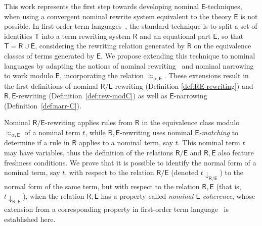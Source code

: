 \documentclass[11pt,a4paper]{amsart}
\newcommand{\theory}[1]{\ensuremath{\mathsf{#1}}}
\theoremstyle{plain}
\theoremstyle{definition}
\theoremstyle{remark}
\begin{document}
 This work represents the first step towards developing nominal \theory{E}-techniques, when using a convergent nominal rewrite system equivalent to the theory $\theory{E}$ is not possible.  
 In first-order term languages~\cite{JouannaudKK83:Incremental, Viola01, VariantNarrowing:EscobarMS09}, the standard technique is to split a set of identities \theory{T}  into a term rewriting system $\theory{R}$ and an equational part $\theory{E}$, so that $\theory{T}=\theory{R}{\cup}\theory{E}$, considering the rewriting relation generated by $\theory{R}$ on the equivalence classes of terms generated by $\theory{E}$. We propose extending this technique to nominal languages by adapting the notions of nominal rewriting~\cite{NominalRewriting/FernandezG07,Kikuchi020,Kikuchi22} and nominal narrowing~\cite{NominalNarrowing16}  to work modulo $\theory{E}$, incorporating the relation $\approx_{\alpha,\theory{E}}$.  These extensions result in the first definitions of nominal \theory{R/E}-rewriting (Definition \ref{def:RE-rewriting}) and \theory{R,E}-rewriting (Definition~\ref{def:rew-modC}) as well as \theory{E}-narrowing (Definition~\ref{def:narr-C}).
 
 Nominal \theory{R/E}-rewriting applies rules from \theory{R} in the equivalence class modulo $\approx_{\alpha, \theory{E}}$ of a nominal term $t$, while \theory{R,E}-rewriting uses nominal {\em $\theory{E}$-matching} to determine if a rule in \theory{R} applies to a nominal term, say $t$. This nominal term $t$ may have variables, thus the definition of the relations \theory{R/E} and \theory{R,E} also feature freshness conditions. We prove that it is possible to identify the normal form of a nominal term, say $t$, with respect to the relation \theory{R/E} (denoted $t\downarrow_\theory{R/E}$) to the normal form of the same term, but with respect to the relation \theory{R,E} (that is,  $t\downarrow_\theory{R,E}$), when the relation \theory{R,E} has a property called {\em nominal \theory{E}-coherence}, whose extension from a corresponding property in first-order term language~\cite{Jouannaud83:ConfluentandCoherent} is established here.
 
 
 
\end{document}
